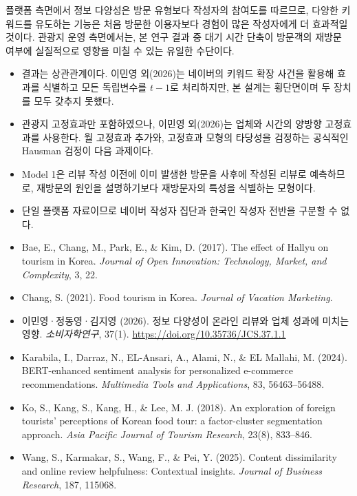 \documentclass[10pt,a4paper]{article}
\newcommand{\subsect}[1]{\vspace{6pt}\noindent{\large\bfseries #1}\par\vspace{2pt}}
\begin{document}
\subsect{5.2 시사점}
플랫폼 측면에서 정보 다양성은 방문 유형보다 작성자의 참여도를 따르므로,
다양한 키워드를 유도하는 기능은 처음 방문한 이용자보다 경험이 많은
작성자에게 더 효과적일 것이다. 관광지 운영 측면에서는, 본 연구 결과 중
대기 시간 단축이 방문객의 재방문 여부에 실질적으로 영향을 미칠 수 있는
유일한 수단이다.

\subsect{5.3 한계 및 향후 과제}
\begin{itemize}[leftmargin=14pt, itemsep=2pt]
  \item 결과는 상관관계이다. 이민영 외(2026)는 네이버의 키워드 확장 사건을
        활용해 효과를 식별하고 모든 독립변수를 $t-1$로 처리하지만, 본
        설계는 횡단면이며 두 장치를 모두 갖추지 못했다.
  \item 관광지 고정효과만 포함하였으나, 이민영 외(2026)는 업체와 시간의
        양방향 고정효과를 사용한다. 월 고정효과 추가와, 고정효과 모형의
        타당성을 검정하는 공식적인 Hausman 검정이 다음 과제이다.
  \item Model 1은 리뷰 작성 이전에 이미 발생한 방문을 사후에 작성된
        리뷰로 예측하므로, 재방문의 원인을 설명하기보다 재방문자의 특성을
        식별하는 모형이다.
  \item 단일 플랫폼 자료이므로 네이버 작성자 집단과 한국인 작성자 전반을
        구분할 수 없다.
\end{itemize}

\vspace{8pt}
\subsect{참고문헌}
\begin{itemize}[leftmargin=14pt, itemsep=3pt]
  \item Bae, E., Chang, M., Park, E., \& Kim, D. (2017). The effect of
        Hallyu on tourism in Korea. \textit{Journal of Open Innovation:
        Technology, Market, and Complexity}, 3, 22.
  \item Chang, S. (2021). Food tourism in Korea. \textit{Journal of
        Vacation Marketing}.
  \item 이민영·정동영·김지영 (2026). 정보 다양성이 온라인 리뷰와 업체
        성과에 미치는 영향. \textit{소비자학연구}, 37(1).
        \url{https://doi.org/10.35736/JCS.37.1.1}
  \item Karabila, I., Darraz, N., EL-Ansari, A., Alami, N., \& EL Mallahi,
        M. (2024). BERT-enhanced sentiment analysis for personalized
        e-commerce recommendations. \textit{Multimedia Tools and
        Applications}, 83, 56463--56488.
  \item Ko, S., Kang, S., Kang, H., \& Lee, M. J. (2018). An exploration of
        foreign tourists' perceptions of Korean food tour: a
        factor-cluster segmentation approach. \textit{Asia Pacific Journal
        of Tourism Research}, 23(8), 833--846.
  \item Wang, S., Karmakar, S., Wang, F., \& Pei, Y. (2025). Content
        dissimilarity and online review helpfulness: Contextual insights.
        \textit{Journal of Business Research}, 187, 115068.
\end{itemize}
\end{document}
